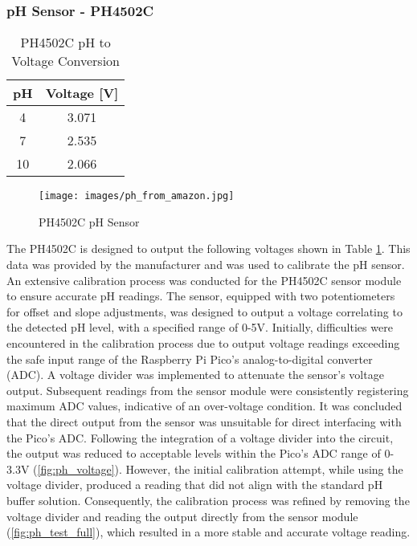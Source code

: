 \documentclass[12pt]{article} %
\begin{document}
\subsubsection{pH Sensor - PH4502C}
\begin{table}[H]
    \centering
    \begin{tabular}{|c|c|}
        \hline
        \textbf{pH} & \textbf{Voltage [V]} \\
        \hline
        4 & 3.071\\
        \hline
        7 & 2.535\\
        \hline
        10 & 2.066\\
        \hline
    \end{tabular}
    \caption{PH4502C pH to Voltage Conversion}
    \label{tab:PH4502C}
\end{table}
\begin{figure}[H]
    \centering
    \texttt{[image: images/ph\_from\_amazon.jpg]}
    \caption{PH4502C pH Sensor \cite{ref_ph_amazon}}
    \label{fig:PH4502C}
\end{figure}
\noindent The PH4502C \cite{ref_phsensor} is designed to output the following voltages shown in Table \ref{tab:PH4502C}.
This data was provided by the manufacturer and was used to calibrate the pH sensor. An extensive calibration process was conducted for the PH4502C sensor module to ensure accurate pH readings. The sensor, equipped with two potentiometers for offset and slope adjustments, was designed to output a voltage correlating to the detected pH level, with a specified range of 0-5V.
\newline
\newline
\noindent Initially, difficulties were encountered in the calibration process due to output voltage readings exceeding the safe input range of the Raspberry Pi Pico’s analog-to-digital converter (ADC). A voltage divider was implemented to attenuate the sensor's voltage output. Subsequent readings from the sensor module were consistently registering maximum ADC values, indicative of an over-voltage condition. It was concluded that the direct output from the sensor was unsuitable for direct interfacing with the Pico’s ADC.
Following the integration of a voltage divider into the circuit, the output was reduced to acceptable levels within the Pico's ADC range of 0-3.3V (\ref{fig:ph_voltage}). However, the initial calibration attempt, while using the voltage divider, produced a reading that did not align with the standard pH buffer solution. Consequently, the calibration process was refined by removing the voltage divider and reading the output directly from the sensor module (\ref{fig:ph_test_full}), which resulted in a more stable and accurate voltage reading.
\end{document}
